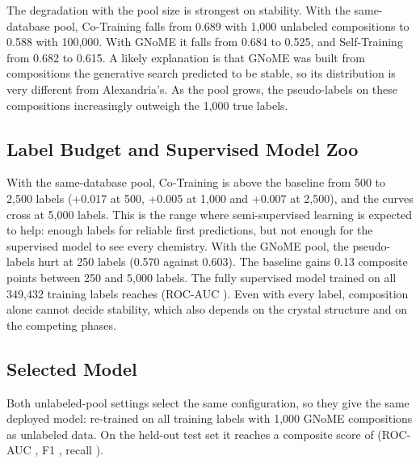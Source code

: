 

The degradation with the pool size is strongest on stability. With the same-database pool,
Co-Training falls from 0.689 with 1,000 unlabeled compositions to 0.588 with 100,000. With
GNoME it falls from 0.684 to 0.525, and Self-Training from 0.682 to 0.615. A likely
explanation is that GNoME was built from compositions the generative search predicted to be
stable, so its distribution is very different from Alexandria's. As the pool grows, the
pseudo-labels on these compositions increasingly outweigh the 1,000 true labels.

\subsection*{Label Budget and Supervised Model Zoo}



With the same-database pool, Co-Training is above the baseline from 500 to 2,500 labels
(+0.017 at 500, +0.005 at 1,000 and +0.007 at 2,500), and the curves cross at 5,000 labels.
This is the range where semi-supervised learning is expected to help: enough labels for
reliable first predictions, but not enough for the supervised model to see every chemistry.
With the GNoME pool, the pseudo-labels hurt at 250 labels (0.570 against 0.603). The baseline
gains 0.13 composite points between 250 and 5,000 labels. The fully supervised model trained on
all 349,432 training labels reaches \StabInFullComp{} (ROC-AUC \StabInFullAUC{}). Even with
every label, composition alone cannot decide stability, which also depends on the crystal
structure and on the competing phases.

\subsection*{Selected Model}

Both unlabeled-pool settings select the same configuration, so they give the same deployed
model: \StabSelMethod{} re-trained on all training labels with 1,000 GNoME compositions as
unlabeled data. On the held-out test set it reaches a composite score of \StabSelComp{}
(ROC-AUC \StabSelAUC{}, F1 \StabSelFone{}, recall \StabSelRec{}).

